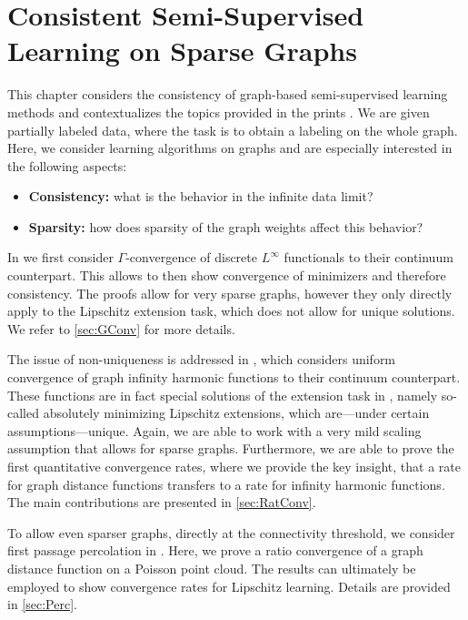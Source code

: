 \chapter{Consistent Semi-Supervised Learning on Sparse Graphs}\label{ch:SSL}

This chapter considers the consistency of graph-based semi-supervised learning methods and contextualizes the topics provided in the prints \cite{roith2022continuum, bungert2021uniform, bungert2022ratio}. We are given partially labeled data, where the task is to obtain a labeling on the  whole graph. Here, we consider learning algorithms on graphs and are especially interested in the following aspects:
%
\begin{itemize}
\item \textbf{Consistency:} what is the behavior in the infinite data limit?
\item \textbf{Sparsity:} how does sparsity of the graph weights affect this behavior?
\end{itemize}
%
%
In \cite{roith2022continuum} we first consider $\Gamma$-convergence of discrete $L^\infty$ functionals to their continuum counterpart. This allows to then show convergence of minimizers and therefore consistency. The proofs allow for very sparse graphs, however they only directly apply to the Lipschitz extension task, which does not allow for unique solutions. We refer to \cref{sec:GConv} for more details.

The issue of non-uniqueness is addressed in \cite{bungert2021uniform}, which considers uniform convergence of graph infinity harmonic functions to their continuum counterpart. These functions are in fact special solutions of the extension task  in \cite{roith2022continuum}, namely so-called absolutely minimizing Lipschitz extensions, which are---under certain assumptions---unique. Again, we are able to work with a very mild scaling assumption that allows for sparse graphs. Furthermore, we are able to prove the first quantitative convergence rates, where we provide the key insight, that a rate for graph distance functions transfers to a rate for infinity harmonic functions. The main contributions are presented in \cref{sec:RatConv}.

To allow even sparser graphs, directly at the connectivity threshold, we consider first passage percolation in \cite{bungert2022ratio}. Here, we prove a ratio convergence of a graph distance function on a Poisson point cloud. The results can ultimately be employed to show convergence rates for Lipschitz learning. Details are provided in \cref{sec:Perc}.

